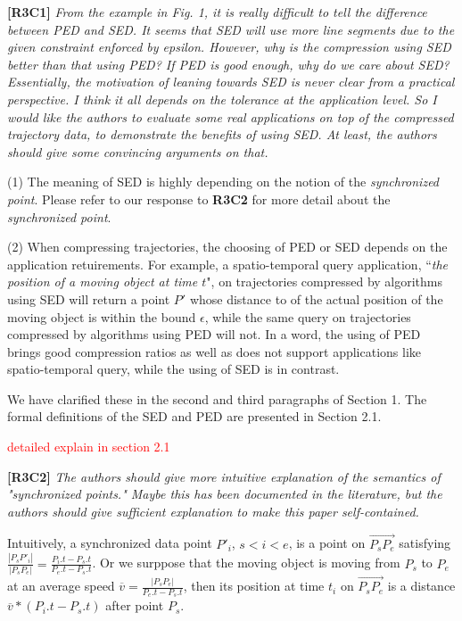 \documentclass{letter}
\begin{document}
\textbf{[R3C1]} \emph{From the example in Fig. 1, it is really difficult to tell the difference between PED and SED. It seems that SED will use more line segments due to the given constraint enforced by epsilon. However, why is the compression using SED better than that using PED? If PED is good enough, why do we care about SED? Essentially, the motivation of leaning towards SED is never clear from a practical perspective. I think it all depends on the tolerance at the application level. So I would like the authors to evaluate some real applications on top of the compressed trajectory data, to demonstrate the benefits of using SED. At least, the authors should give some convincing arguments on that.}

(1) The meaning of SED is highly depending on the notion of the \emph{synchronized point}. Please refer to our response to \textbf{R3C2} for more detail about the \emph{synchronized point}.

(2) When compressing trajectories, the choosing of PED or SED depends on the application retuirements. For example, a spatio-temporal query application, ``\emph{the position of a moving object at time $t$}", on trajectories compressed by algorithms using SED will return a point $P'$ whose distance to of the actual position of the moving object is within the bound $\epsilon$, while the same query on trajectories compressed by algorithms using PED will not. In a word, the using of PED brings good compression ratios as well as does not support applications like spatio-temporal query, while the using of SED is in contrast.

We have clarified these in the second and third paragraphs of Section 1.
The formal definitions of the SED and PED are presented in Section 2.1.

\textcolor{red}{detailed explain in section 2.1}

\textbf{[R3C2]} \emph{The authors should give more intuitive explanation of the semantics of "synchronized points." Maybe this has been documented in the literature, but the authors should give sufficient explanation to make this paper self-contained.}

Intuitively, a synchronized data point $P'_i$, $s<i<e$, is a point on $\overrightarrow{P_sP_{e}}$ satisfying $\frac{|P_sP'_i|}{|P_sP_e|} = \frac{P_i.t - P_s.t}{P_e.t-P_s.t}$.
Or we surppose that the moving object is moving from $P_s$ to $P_e$ at an average speed $\overline{v} = \frac{|P_sP_e|}{P_e.t-P_s.t}$, then its position at time $t_i$ on $\overrightarrow{P_sP_{e}}$ is a distance $\overline{v}*(P_i.t-P_s.t)$ after point $P_s$.
\end{document}
